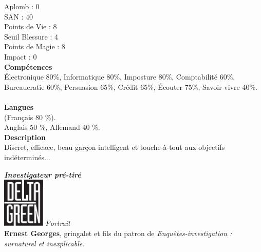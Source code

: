 \documentclass[11pt,twoside,a4paper]{article}
\begin{document}
\begin{multicols}{3}
	 Aplomb : 0~\\
	 SAN : 40~\\
	 Points de Vie : 8~\\
	 Seuil Blessure : 4~\\
	 Points de Magie : 8~\\
	 Impact :  0~\\

	\textbf{Comp{\'e}tences}~\\
		{\'E}lectronique 80\%, 
		Informatique 80\%, 
		Imposture 80\%, 
		Comptabilit{\'e} 60\%, 
		Bureaucratie 60\%, 
		Persuasion 65\%, 
		Cr{\'e}dit 65\%, 
		{\'E}couter 75\%, 
		Savoir-vivre 40\%. ~\\

	\textbf{Langues}~\\
	(Fran\c{c}ais 80 \%). ~\\
	Anglais 50 \%, Allemand 40 \%. ~\\

	\textbf{Description}~\\
	Discret, efficace, beau gar\c{c}on intelligent et touche-{\`a}-tout aux objectifs ind{\'e}termin{\'e}s...

	
		
	\vfill
	\columnbreak

	\textbf{\emph{Investigateur pr{\'e}-tir{\'e}}}~\\

	\includegraphics[width=0.15\textwidth]{DeltaGreenLogo.png} \emph{Portrait}~\\
	
	\textbf{\Large Ernest Georges}, gringalet et fils du patron de \emph{Enqu{\^e}tes-investigation : surnaturel et inexplicable}. ~\\


\end{multicols}
\end{document}
